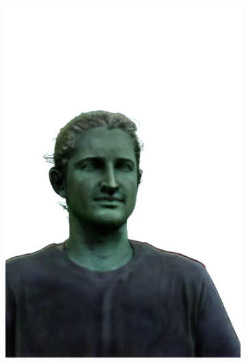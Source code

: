 \begin{figure}[ht]
\begin{subfigure}{0.08\linewidth}
        \includegraphics[width=\textwidth]{Figures/results/low/ephra_stone/11_render.png}

\end{subfigure}
\end{figure}
